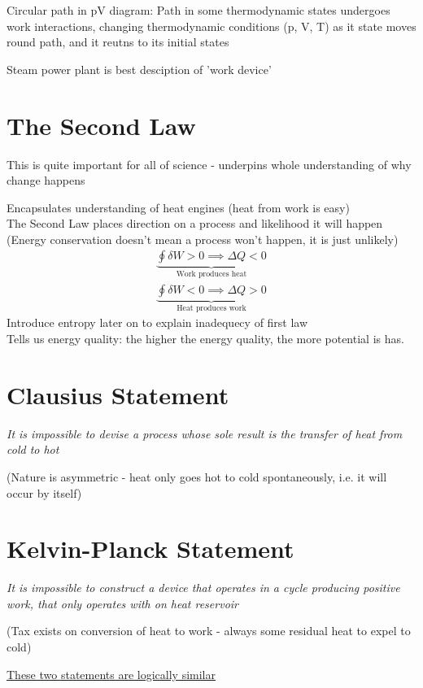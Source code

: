 \documentclass[a4paper, 11pt, normalem]{report}
\begin{document}
Circular path in pV diagram: Path in some thermodynamic states undergoes work interactions, changing thermodynamic conditions (p, V, T) as it state moves round path, and it reutns to its initial states

Steam power plant is best desciption of 'work device'

\section{The Second Law}
This is quite important for all of science - underpins whole understanding of why change happens

Encapsulates understanding of heat engines (heat from work is easy) \\
The Second Law places direction on a process and likelihood it will happen \\
(Energy conservation doesn't mean a process won't happen, it is just unlikely)
\begin{gather*}
    \underbrace{\oint \delta W > 0 \implies \Delta Q < 0}_{\text{Work produces heat}} \\
    \underbrace{\oint \delta W < 0 \implies \Delta Q > 0}_{\text{Heat produces work}}
\end{gather*}
Introduce entropy later on to explain inadequecy of first law \\
Tells us energy quality: the higher the energy quality, the more potential is has.

\section{Clausius Statement}
\emph{It is impossible to devise a process whose sole result is the transfer of heat from cold to hot}

(Nature is asymmetric - heat only goes hot to cold spontaneously, i.e. it will occur by itself)

\section{Kelvin-Planck Statement}
\emph{It is impossible to construct a device that operates in a cycle producing positive work, that only operates with on heat reservoir}

(Tax exists on conversion of heat to work - always some residual heat to expel to cold)

\underline{These two statements are logically similar}
\end{document}
